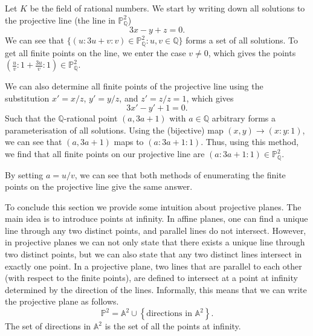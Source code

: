 \documentclass[openany, a4paper, 10pt]{book}
\theoremstyle{plain}
\theoremstyle{plain}
\theoremstyle{plain}
\theoremstyle{definition}
\theoremstyle{plain}
\theoremstyle{definition}
\theoremstyle{remark}
\begin{document}
\begin{examplebox}
    Let $K$ be the field of rational numbers.
    We start by writing down all solutions to the projective line (the line in $\mathbb P^2_{\mathbb Q}$)
    \begin{equation*}
        3x - y + z = 0.
    \end{equation*}
    We can see that $\{ (u: 3u+v:v) \in \mathbb P^2_{\mathbb Q} : u,v \in \mathbb Q \}$ forms a set of all solutions.
    To get all finite points on the line, we enter the case $v \neq 0$, which gives the points $(\frac{u}{v}: 1+\frac{3u}{v}: 1) \in \mathbb P^2_{\mathbb Q}$.

    We can also determine all finite points of the projective line using the substitution $x'=x/z$, $y'=y/z$, and $z'=z/z=1$, which gives
    \begin{equation*}
        3x' - y' + 1 = 0.
    \end{equation*}
    Such that the $\mathbb Q$-rational point $(a, 3a+1)$ with $a \in \mathbb Q$ arbitrary forms a parameterisation of all solutions.
    Using the (bijective) map $(x, y) \to (x: y: 1)$, we can see that $(a, 3a+1)$ maps to $(a : 3a+1: 1)$.
    Thus, using this method, we find that all finite points on our projective line are $(a: 3a+1: 1) \in \mathbb P^2_{\mathbb Q}$.

    By setting $a = u/v$, we can see that both methods of enumerating the finite points on the projective line give the same answer.
\end{examplebox}


To conclude this section we provide some intuition about projective planes.
The main idea is to introduce points at infinity.
In affine planes, one can find a unique line through any two distinct points, and parallel lines do not intersect.
However, in projective planes we can not only state that there exists a unique line through two distinct points, but we can also state that any two distinct lines intersect in exactly one point.
In a projective plane, two lines that are parallel to each other (with respect to the finite points), are defined to intersect at a point at infinity determined by the direction of the lines.
Informally, this means that we can write the projective plane as follows.
\begin{equation*}
    \mathbb P^2 = \mathbb A^2 \cup \left\{ \text{directions in } \mathbb A^2 \right\}.
\end{equation*}
The set of directions in $\mathbb A^2$ is the set of all the points at infinity.
\end{document}

